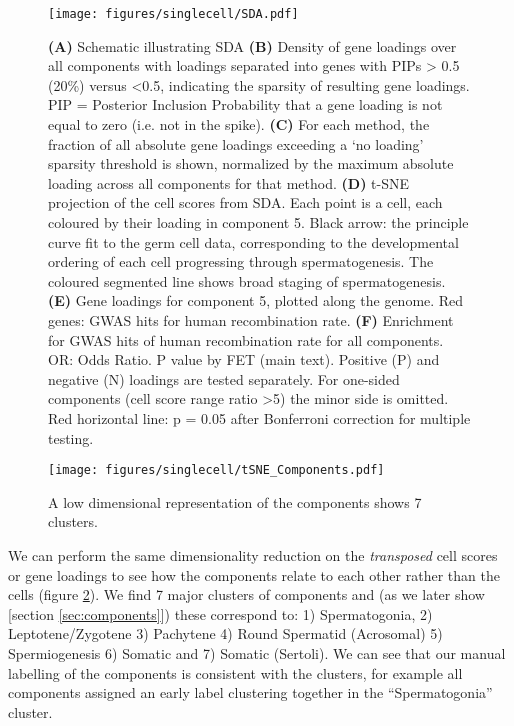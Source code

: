 \begin{figure}[H]
	\centering
	\texttt{[image: figures/singlecell/SDA.pdf]}
	\caption[SDA]{
		\textbf{(A)} Schematic illustrating SDA
		\textbf{(B)} Density of gene loadings over all components with loadings separated into genes with PIPs > 0.5 (20\%) versus <0.5, indicating the sparsity of resulting gene loadings. PIP = Posterior Inclusion Probability that a gene loading is not equal to zero (i.e. not in the spike).
		\textbf{(C)} For each method, the fraction of all absolute gene loadings exceeding a ‘no loading’ sparsity threshold is shown, normalized by the maximum absolute loading across all components for that method. 
		\textbf{(D)} t-SNE projection of the cell scores from SDA. Each point is a cell, each coloured by their loading in component 5. Black arrow: the principle curve fit to the germ cell data, corresponding to the developmental ordering of each cell progressing through spermatogenesis. The coloured segmented line shows broad staging of spermatogenesis.
		\textbf{(E)} Gene loadings for component 5, plotted along the genome. Red genes: GWAS hits for human recombination rate.
		\textbf{(F)} Enrichment for GWAS hits of human recombination rate for all components. OR: Odds Ratio. P value by FET (main text). Positive (P) and negative (N) loadings are tested separately. For one-sided components (cell score range ratio >5) the minor side is omitted. Red horizontal line: p = 0.05 after Bonferroni correction for multiple testing.
	}
	\label{fig:SDA}
\end{figure}

\begin{figure}[H]
	\centering
	\texttt{[image: figures/singlecell/tSNE\_Components.pdf]}
	\caption[t-SNE of Components]{A low dimensional representation of the components shows 7 clusters.}
	\label{fig:tSNE_Components}
\end{figure}


We can perform the same dimensionality reduction on the \emph{transposed} cell scores or gene loadings to see how the components relate to each other rather than the cells (figure \ref{fig:tSNE_Components}). We find 7 major clusters of components and (as we later show [section \ref{sec:components}]) these correspond to: 1) Spermatogonia, 2) Leptotene/Zygotene 3) Pachytene 4) Round Spermatid (Acrosomal) 5) Spermiogenesis 6) Somatic and 7) Somatic (Sertoli). We can see that our manual labelling of the components is consistent with the clusters, for example all components assigned an early label clustering together in the ``Spermatogonia'' cluster.

